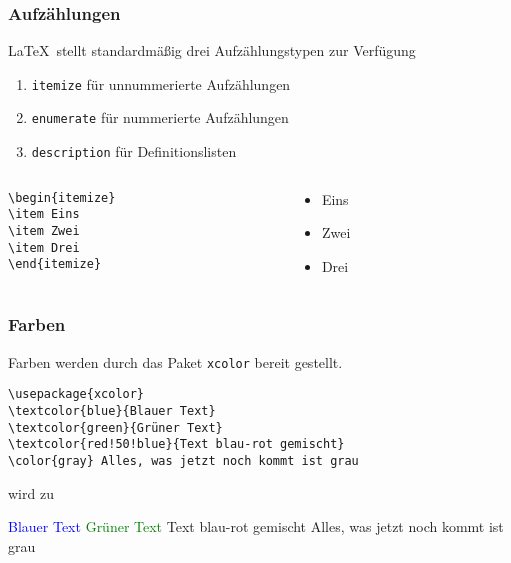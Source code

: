 \begin{frame}[fragile]
  \frametitle{Aufzählungen}

  \LaTeX\ stellt standardmäßig drei Aufzählungstypen zur Verfügung%

  \onslide<+->

  \begin{enumerate}
  \item<+-> \lstinline{itemize} für unnummerierte Aufzählungen
  \item<+-> \lstinline{enumerate} für nummerierte Aufzählungen
  \item<+-> \lstinline{description} für Definitionslisten
  \end{enumerate}

  \onslide<+->

  \begin{Beispiel}
    \begin{columns}
      \begin{column}{0.5\linewidth}
\begin{lstlisting}
\begin{itemize}
\item Eins
\item Zwei
\item Drei
\end{itemize}
\end{lstlisting}
      \end{column}
      \onslide<+->
      \begin{column}{0.5\linewidth}
        \begin{itemize}
        \item Eins
        \item Zwei
        \item Drei
        \end{itemize}
      \end{column}
    \end{columns}
  \end{Beispiel}

\end{frame}

\begin{frame}[fragile]
  \frametitle{Farben}

  \onslide<+->

  Farben werden durch das Paket \lstinline{xcolor} bereit gestellt.

  \onslide<+->

\begin{lstlisting}
\usepackage{xcolor}
\textcolor{blue}{Blauer Text}
\textcolor{green}{Grüner Text}
\textcolor{red!50!blue}{Text blau-rot gemischt}
\color{gray} Alles, was jetzt noch kommt ist grau
\end{lstlisting}

  wird zu\onslide<+->

  \textcolor{blue}{Blauer Text}
  \textcolor{green}{Grüner Text}
  \textcolor{red!50!blue}{Text blau-rot gemischt}
  \color{gray} Alles, was jetzt noch kommt ist grau

\end{frame}

